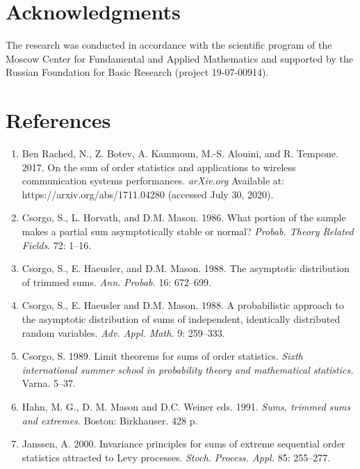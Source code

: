 \documentclass[14pt,a4paper]{extarticle}
\begin{document}
\section*{Acknowledgments}
The research was conducted in accordance with the scientific program of the Moscow Center for Fundamental and Applied Mathematics and supported by the Russian Foundation for Basic Research (project 19-07-00914).


\section*{References}
\begin{enumerate}
\renewcommand{\labelenumi}{\theenumi.}
\setlength{\itemsep}{1pt}
\setlength{\parskip}{1pt}


\item
Ben Rached, N., Z. Botev, A. Kammoun, M.-S. Alouini, and R. Tempone. 2017.
On the sum of order statistics and applications to wireless communication systems performances.
{\it arXiv.org} Available at: https://arxiv.org/abs/1711.04280 
(accessed July 30, 2020).

\item
Csorgo, S., L. Horvath, and D.M. Mason. 1986.
What portion of the sample makes a partial sum asymptotically stable or normal?
{\it Probab. Theory Related Fields}. 72: 1--16.

\item
Csorgo, S., E. Haeusler, and D.M. Mason. 1988.
The asymptotic distribution of trimmed sums.
{\it Ann. Probab.} 16: 672--699.

\item
Csorgo, S., E. Haeusler and D.M. Mason. 1988.
A probabilistic approach to the asymptotic
distribution of sums of independent, identically distributed random variables.
{\it Adv. Appl. Math.} 9: 259--333.

\item
Csorgo, S. 1989. 
Limit theorems for sums of order statistics. 
{\it Sixth international summer school in probability theory and mathematical statistics.}
Varna. 5--37.

\item
Hahn, M. G., D. M. Mason and D.C. Weiner eds. 1991.
{\it Sums, trimmed sums and extremes.}
Boston: Birkhauser. 428 p.

\item
Janssen, A. 2000.
Invariance principles for sums of extreme sequential order statistics attracted to Levy processes.
{\it Stoch. Process. Appl.} 85: 255--277.


\end{enumerate}
\end{document}
